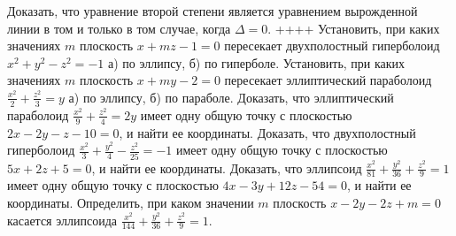Доказать, что уравнение второй степени является уравнением вырожденной линии в том и только в том случае, когда $\Delta=0$.
++++
Установить, при каких значениях $m$ плоскость $x+m z-1=0$ пересекает двухполостный гиперболоид $x^2+y^2-z^2=-1$ а) по эллипсу, б) по гиперболе.
Установить, при каких значениях $m$ плоскость $x+m y-2=0$ пересекает эллиптический параболоид $\frac{x^2}{2}+\frac{z^2}{3}=y$ а) по эллипсу, б) по параболе.
Доказать, что эллиптический параболоид $\frac{x^2}{9}+\frac{z^2}{4}=2 y$ имеет одну общую точку с плоскостью $2 x-2 y-z-10=0$, и найти ее координаты.
Доказать, что двухполостный гиперболоид $\frac{x^2}{3}+\frac{y^2}{4}-\frac{z^2}{25}=-1$ имеет одну общую точку с плоскостью $5 x+2 z+5=0$, и найти ее координаты.
Доказать, что эллипсоид $\frac{x^2}{81}+\frac{y^2}{36}+\frac{z^2}{9}=1$ имеет одну общую точку с плоскостью $4 x-3 y+12 z-54=0$, и найти ее координаты.
Определить, при каком значении $m$ плоскость $x-2 y-2 z+m=0$ касается эллипсоида $\frac{x^2}{144}+\frac{y^2}{36}+\frac{z^2}{9}=1$.
